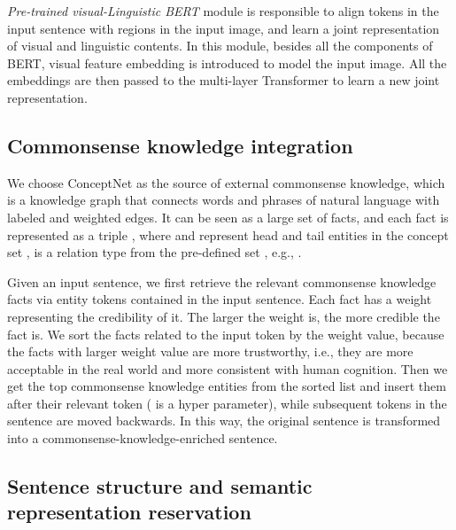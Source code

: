\documentclass[conference]{IEEEtran}
\begin{document}
\emph{Pre-trained visual-Linguistic BERT} module is responsible to align tokens in the input sentence with regions in the input image, and learn a joint representation of visual and linguistic contents. In this module, besides all the components of BERT, visual feature embedding is introduced to model the input image. All the embeddings are then passed to the multi-layer Transformer to learn a new joint representation.

















\subsection{Commonsense knowledge integration}\label{B}

We choose ConceptNet as the source of external commonsense knowledge, which is a knowledge graph that connects words and phrases of natural language with labeled and weighted edges. It can be seen as a large set of facts, and each fact  is represented as a triple , where  and   represent head and tail entities in the concept set ,  is a relation type from the pre-defined set , e.g., . 





Given an input sentence, we first retrieve the relevant commonsense knowledge facts via entity tokens contained in the input sentence. Each fact has a weight representing the credibility of it. The larger the weight is, the more credible the fact is. We sort the facts related to the input token by the weight value, because the facts with larger weight value are more trustworthy, i.e., they are more acceptable in the real world and more consistent with human cognition. Then we get the top  commonsense knowledge entities from the sorted list and insert them after their relevant token ( is a hyper parameter), while subsequent tokens in the sentence are moved backwards. In this way, the original sentence is transformed into a commonsense-knowledge-enriched sentence.






\subsection{Sentence structure and semantic representation reservation}\label{C}
\end{document}
